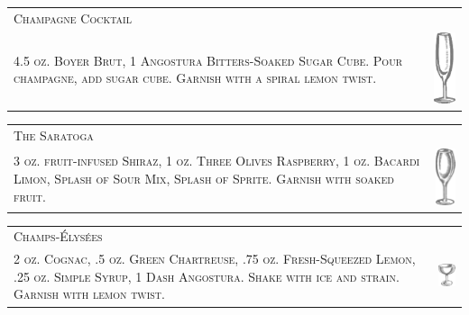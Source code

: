 \documentclass{article}
\begin{document}
\begin{tabular}{b{2.5in} m{0.625in}}
  \multicolumn{2}{p{3.5in}}{\centering\Huge\textsc{Champagne Cocktail}} \\ 
  
  \textsc{4.5 oz. Boyer Brut, 1 Angostura Bitters-Soaked Sugar
    Cube. Pour champagne, add sugar cube.  Garnish with a spiral lemon
    twist.} & \includegraphics[width=0.5in]{flute.png}
\end{tabular}

\begin{tabular}{b{2.5in} m{0.625in}}
  \multicolumn{2}{p{3.5in}}{\centering\Huge\textsc{The Saratoga}} \\ 
  
  \textsc{3 oz. fruit-infused Shiraz, 1 oz. Three Olives Raspberry, 1
    oz. Bacardi Limon, Splash of Sour Mix, Splash of Sprite. Garnish
    with soaked fruit.} &
  \includegraphics[width=0.5in]{wine_glass.png}
\end{tabular}

\begin{tabular}{b{2.5in} m{0.625in}}
  \multicolumn{2}{p{3.5in}}{\centering\Huge\textsc{Champs-\'{E}lys\'{e}es}} \\ 
  
  \textsc{2 oz. Cognac, .5 oz. Green Chartreuse, .75 oz.
    Fresh-Squeezed Lemon, .25 oz. Simple Syrup, 1 Dash
    Angostura. Shake with ice and strain.  Garnish with lemon twist.}
  & \includegraphics[width=0.5in]{egg_coupe.png}
\end{tabular}
\end{document}
